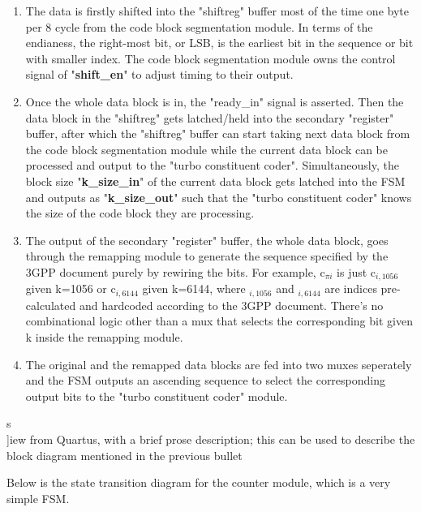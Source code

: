 \documentclass[letterpaper]{article} %
\begin{document}
\begin{enumerate}
    \item The data is firstly shifted into the "shiftreg" buffer most of the time one byte per 8 cycle from the code block segmentation module. In terms of the endianess, the right-most bit, or LSB, is the earliest bit in the sequence or bit with smaller index. The code block segmentation module owns the control signal of "{\bf shift\_en}" to adjust timing to their output.
    \item Once the whole data block is in, the "ready\_in" signal is asserted. Then the data block in the "shiftreg" gets latched/held into the secondary "register" buffer, after which the "shiftreg" buffer can start taking next data block from the code block segmentation module while the current data block can be processed and output to the "turbo constituent coder". Simultaneously, the block size "{\bf k\_size\_in}" of the current data block gets latched into the FSM and outputs as "{\bf k\_size\_out}" such that the "turbo constituent coder" knows the size of the code block they are processing.
    \item The output of the secondary "register" buffer, the whole data block, goes through the remapping module to generate the sequence specified by the 3GPP document purely by rewiring the bits. For example, c$_{\pi i}$ is just c$_{i,1056}$ given k=1056 or c$_{i,6144}$ given k=6144, where $_{i,1056}$ and $_{i,6144}$ are indices pre-calculated and hardcoded according to the 3GPP document. There's no combinational logic other than a mux that selects the corresponding bit given k inside the remapping module.
    \item The original and the remapped data blocks are fed into two muxes seperately and the FSM outputs an ascending sequence to select the corresponding output bits to the "turbo constituent coder" module.
\end{enumerate}
s\\
         ]iew from Quartus, with a brief prose description;  this can
            be used to describe the block diagram mentioned in the
			previous bullet


Below is the state transition diagram for the counter module, which is a very simple FSM.

\begin{minipage}{1.0\textwidth}
\centering
{}
\centering
\end{minipage}
\bigskip
\end{document}
